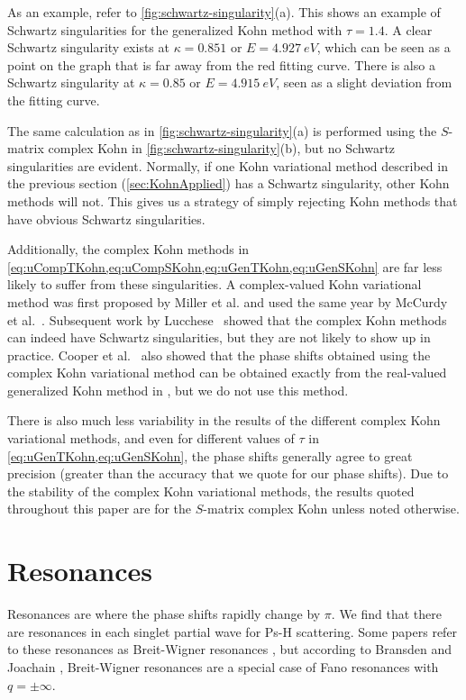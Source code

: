 \documentclass[Dissertation.tex]{subfiles}
\begin{document}
As an example, refer to \cref{fig:schwartz-singularity}(a). This shows an 
example of Schwartz singularities for the generalized Kohn method with
$\tau = 1.4$. A clear Schwartz singularity exists at $\kappa = 0.851$ or $E = \SI{4.927}{eV}$,
which can be seen as a point on the graph that is far away from 
the red fitting curve. There is also a Schwartz singularity at $\kappa = 0.85$
or $E = \SI{4.915}{eV}$, seen as a slight deviation from the fitting curve.

The same calculation as in \cref{fig:schwartz-singularity}(a) is performed 
using the $S$-matrix complex Kohn in \cref{fig:schwartz-singularity}(b), but 
no Schwartz singularities are evident. Normally, if one Kohn variational 
method described in the previous section (\cref{sec:KohnApplied}) has a 
Schwartz singularity, other Kohn methods will not. This gives us a strategy 
of simply rejecting Kohn methods that have obvious Schwartz singularities.



Additionally, the complex Kohn methods in
\cref{eq:uCompTKohn,eq:uCompSKohn,eq:uGenTKohn,eq:uGenSKohn} are far less likely to 
suffer from these singularities. A complex-valued Kohn variational method was 
first proposed by Miller et al. \cite{Miller1987} and used the same year by 
McCurdy et al.~\cite{McCurdy1987}. Subsequent work by
Lucchese~\cite{Lucchese1989} showed that the complex Kohn methods can indeed have
Schwartz singularities, but they are not likely to show up in practice.
Cooper et al.~\cite{Cooper2010} also showed that the phase shifts obtained using the 
complex Kohn variational method can be obtained exactly from the real-valued 
generalized Kohn method in \cite{eq:uGenKohn}, but we do not use this method.

There is also much less variability in the results of the different complex 
Kohn variational methods, and even for different values of $\tau$ in
\cref{eq:uGenTKohn,eq:uGenSKohn}, the phase shifts generally agree to great 
precision (greater than the accuracy that we quote for our phase shifts). Due 
to the stability of the complex Kohn variational methods, the results quoted 
throughout this paper are for the $S$-matrix complex Kohn unless noted 
otherwise.




\section{Resonances}
\label{sec:Resonances}
Resonances are where the phase shifts rapidly change by $\pi$. We find that 
there are resonances in each singlet partial wave for Ps-H scattering. Some 
papers refer to these resonances as Breit-Wigner resonances
\cite{Tennyson1984,Stibbe1998}, but according to Bransden and Joachain
\cite[p.596]{Bransden2003}, Breit-Wigner resonances are a special case of Fano
resonances with $q = \pm\infty$.
\end{document}
